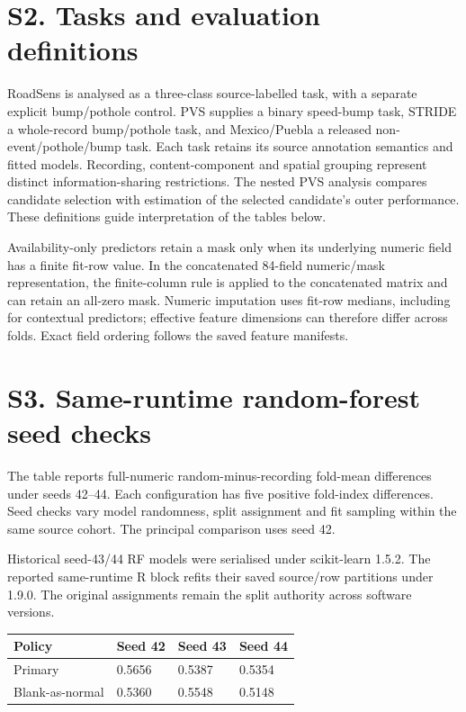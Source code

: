 \section*{S2. Tasks and evaluation definitions}
RoadSens is analysed as a three-class source-labelled task, with a separate explicit bump/pothole control. PVS supplies a binary speed-bump task, STRIDE a whole-record bump/pothole task, and Mexico/Puebla a released non-event/pothole/bump task. Each task retains its source annotation semantics and fitted models. Recording, content-component and spatial grouping represent distinct information-sharing restrictions. The nested PVS analysis compares candidate selection with estimation of the selected candidate's outer performance. These definitions guide interpretation of the tables below.

Availability-only predictors retain a mask only when its underlying numeric field has a finite fit-row value. In the concatenated 84-field numeric/mask representation, the finite-column rule is applied to the concatenated matrix and can retain an all-zero mask. Numeric imputation uses fit-row medians, including for contextual predictors; effective feature dimensions can therefore differ across folds. Exact field ordering follows the saved feature manifests.

\section*{S3. Same-runtime random-forest seed checks}
The table reports full-numeric random-minus-recording fold-mean differences under seeds 42--44. Each configuration has five positive fold-index differences. Seed checks vary model randomness, split assignment and fit sampling within the same source cohort. The principal comparison uses seed 42.

Historical seed-43/44 RF models were serialised under scikit-learn 1.5.2. The reported same-runtime R block refits their saved source/row partitions under 1.9.0. The original assignments remain the split authority across software versions.

\par\medskip
\begin{singlespace}\small
\noindent\begin{minipage}{\linewidth}
\centering
{}
\begin{tabularx}{\linewidth}{XYYY}
\toprule
Policy & Seed 42 & Seed 43 & Seed 44 \\
\midrule
Primary & 0.5656 & 0.5387 & 0.5354 \\
Blank-as-normal & 0.5360 & 0.5548 & 0.5148 \\
\bottomrule
\end{tabularx}
\end{minipage}
\end{singlespace}
\par\medskip
